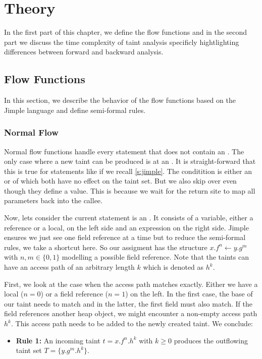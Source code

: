 \documentclass[../draft.tex]{subfiles}
\begin{document}
    \chapter{Theory}
    In the first part of this chapter, we define the flow functions and in the second part we discuss the time complexity of taint analysis specificly hightlighting differences between forward and backward analysis.

    \section{Flow Functions}
    In this section, we describe the behavior of the flow functions based on the Jimple language and define semi-formal rules.

    \subsection{Normal Flow}\label{s:normalflow}
    Normal flow functions handle every statement that does not contain an . The only case where a new taint can be produced is at an . It is straight-forward that this is true for statements like  if we recall \autoref{s:jimple}. The conditition is either an  or  of which both have no effect on the taint set. But we also skip over  even though they define a value. This is because we wait for the return site to map all parameters back into the callee.

    Now, lets consider the current statement is an . It consists of a variable, either a reference or a local, on the left side and an expression on the right side. Jimple ensures we just see one field reference at a time but to reduce the semi-formal rules, we take a shortcut here. So our assigment has the structure $x.f^n \leftarrow y.g^m$ with $n,m \in \{0,1\}$ modelling a possible field reference. Note that the taints can have an access path of an arbitrary length $k$ which is denoted as $h^k$.

    First, we look at the case when the access path matches exactly. Either we have a local ($n=0$) or a field reference ($n=1$) on the left. In the first case, the base of our taint needs to match and in the latter, the first field must also match. If the field references another heap object, we might encounter a non-empty access path $h^k$. This access path needs to be added to the newly created taint. We conclude:
    \begin{itemize}
        \item[] \textbf{Rule 1:} An incoming taint $t = x.f^n.h^k$ with $k \geq 0$ produces the outflowing taint set $T = \{y.g^m.h^k\}$.
    \end{itemize} 
\end{document}
